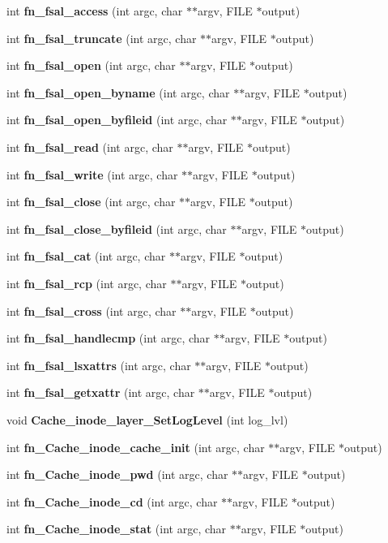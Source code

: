 \begin{CompactItemize}
\item 
int {\bf fn\_\-fsal\_\-access} (int argc, char $\ast$$\ast$argv, FILE $\ast$output)
\item 
int {\bf fn\_\-fsal\_\-truncate} (int argc, char $\ast$$\ast$argv, FILE $\ast$output)
\item 
int {\bf fn\_\-fsal\_\-open} (int argc, char $\ast$$\ast$argv, FILE $\ast$output)
\item 
int {\bf fn\_\-fsal\_\-open\_\-byname} (int argc, char $\ast$$\ast$argv, FILE $\ast$output)
\item 
int {\bf fn\_\-fsal\_\-open\_\-byfileid} (int argc, char $\ast$$\ast$argv, FILE $\ast$output)
\item 
int {\bf fn\_\-fsal\_\-read} (int argc, char $\ast$$\ast$argv, FILE $\ast$output)
\item 
int {\bf fn\_\-fsal\_\-write} (int argc, char $\ast$$\ast$argv, FILE $\ast$output)
\item 
int {\bf fn\_\-fsal\_\-close} (int argc, char $\ast$$\ast$argv, FILE $\ast$output)
\item 
int {\bf fn\_\-fsal\_\-close\_\-byfileid} (int argc, char $\ast$$\ast$argv, FILE $\ast$output)
\item 
int {\bf fn\_\-fsal\_\-cat} (int argc, char $\ast$$\ast$argv, FILE $\ast$output)
\item 
int {\bf fn\_\-fsal\_\-rcp} (int argc, char $\ast$$\ast$argv, FILE $\ast$output)
\item 
int {\bf fn\_\-fsal\_\-cross} (int argc, char $\ast$$\ast$argv, FILE $\ast$output)
\item 
int {\bf fn\_\-fsal\_\-handlecmp} (int argc, char $\ast$$\ast$argv, FILE $\ast$output)
\item 
int {\bf fn\_\-fsal\_\-lsxattrs} (int argc, char $\ast$$\ast$argv, FILE $\ast$output)
\item 
int {\bf fn\_\-fsal\_\-getxattr} (int argc, char $\ast$$\ast$argv, FILE $\ast$output)
\item 
void {\bf Cache\_\-inode\_\-layer\_\-SetLogLevel} (int log\_\-lvl)
\item 
int {\bf fn\_\-Cache\_\-inode\_\-cache\_\-init} (int argc, char $\ast$$\ast$argv, FILE $\ast$output)
\item 
int {\bf fn\_\-Cache\_\-inode\_\-pwd} (int argc, char $\ast$$\ast$argv, FILE $\ast$output)
\item 
int {\bf fn\_\-Cache\_\-inode\_\-cd} (int argc, char $\ast$$\ast$argv, FILE $\ast$output)
\item 
int {\bf fn\_\-Cache\_\-inode\_\-stat} (int argc, char $\ast$$\ast$argv, FILE $\ast$output)
$$
\end{CompactItemize}

